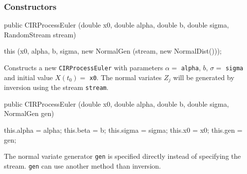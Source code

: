 \subsubsection* {Constructors}
\begin{code}

   public CIRProcessEuler (double x0, double alpha, double b, double sigma,
                           RandomStream stream) \begin{hide} {
      this (x0, alpha, b, sigma, new NormalGen (stream, new NormalDist()));
   }\end{hide}
\end{code}
\begin{tabb} Constructs a new \texttt{CIRProcessEuler} with parameters
$\alpha =$ \texttt{alpha}, $b$, $\sigma =$ \texttt{sigma} and initial value
$X(t_{0}) =$ \texttt{x0}. The normal variates $Z_j$ will be
generated by inversion using the stream \texttt{stream}.
\end{tabb}
\begin{code}

   public CIRProcessEuler (double x0, double alpha, double b, double sigma,
                           NormalGen gen) \begin{hide} {
      this.alpha = alpha;
      this.beta  = b;
      this.sigma = sigma;
      this.x0    = x0;
      this.gen   = gen;
   }\end{hide}
\end{code}
\begin{tabb} The normal variate generator \texttt{gen} is specified directly
instead of specifying the stream.
 \texttt{gen} can use another method than inversion.
\end{tabb}


